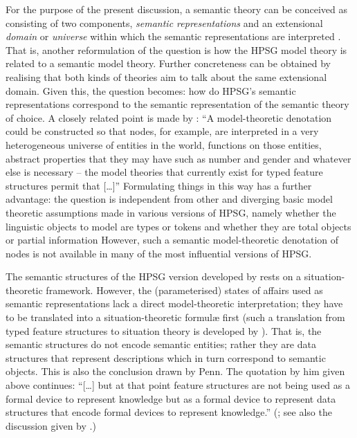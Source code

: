 \documentclass[output=paper]{langsci/langscibook}
\begin{document}
For the purpose of the present discussion, a semantic theory can be conceived as consisting of two components, \emph{semantic representations} and an extensional \emph{domain}  or \emph{universe}  within which the semantic representations are interpreted \citep{Zimmermann:2011:a,Kempson:2011}. 
%
That is, another reformulation of the question is how the HPSG model theory is related to a semantic model theory.
%
Further concreteness can be obtained by realising that both kinds of theories aim to talk about the same extensional domain.%
%
 Given this, the question becomes:  how do HPSG's semantic representations correspond to the semantic representation of the semantic theory of choice.
%
A closely related point is made by \citet[p.~63]{Penn:2000}: \enquote{A model-theoretic denotation could be constructed so that nodes, for example, are interpreted in a very heterogeneous universe of entities in the world, functions on those entities, abstract properties that they may have such as number and gender and whatever else is necessary -- the model theories that currently exist for typed feature structures permit that [\ldots]}
%
Formulating things in  this way has a further advantage: the question is independent from other and diverging basic model theoretic assumptions made in various versions of HPSG, namely whether the linguistic objects to model are types \citep{Pollard:Sag:1994} or tokens \citep{Pollard:Sag:1987} and whether they are total objects \citep{Pollard:Sag:1994} or partial information \citep{Carpenter:1992}
%
However, such a semantic model-theoretic denotation of nodes is not available in many of the most influential versions of HPSG.


The semantic structures of the HPSG version developed by \citet{Pollard:Sag:1994} rests on a situation-theoretic framework. 
%
However, the (parameterised) states of affairs used as semantic representations lack a direct model-theoretic interpretation; they have to be translated into a situation-theoretic formul{\ae} first (such a translation from typed feature structures to situation theory is developed by \citealp{Ginzburg:Sag:2000}).
%
That is, the semantic structures do not encode semantic entities; rather they are data structures that represent descriptions which in turn correspond to semantic objects.
%
This is also the conclusion drawn by Penn.
%
The quotation by him given above continues: \enquote{[\ldots] but at that point feature structures are not being used as a formal device to represent knowledge but as a formal device to represent data structures that encode formal devices to represent knowledge.} (\citet[p.~63]{Penn:2000}; see also the discussion given by \citet[Sec.~5.2.2]{Ginzburg:2012}.)
\end{document}

